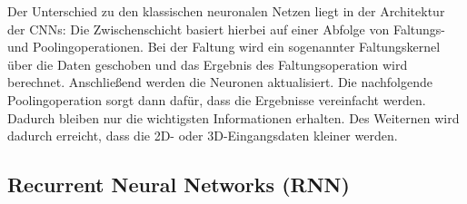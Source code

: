 	Der Unterschied zu den klassischen neuronalen Netzen liegt in der Architektur der CNNs: Die Zwischenschicht basiert hierbei auf einer Abfolge von Faltungs- und Poolingoperationen. Bei der Faltung wird ein sogenannter Faltungskernel über die Daten geschoben und das Ergebnis des Faltungsoperation wird berechnet. Anschließend werden die Neuronen aktualisiert. Die nachfolgende Poolingoperation sorgt dann dafür, dass die Ergebnisse vereinfacht werden. Dadurch bleiben nur die wichtigsten Informationen erhalten.	Des Weiternen wird dadurch erreicht, dass die 2D- oder 3D-Eingangsdaten kleiner werden.

\subsection{Recurrent Neural Networks (RNN)}





